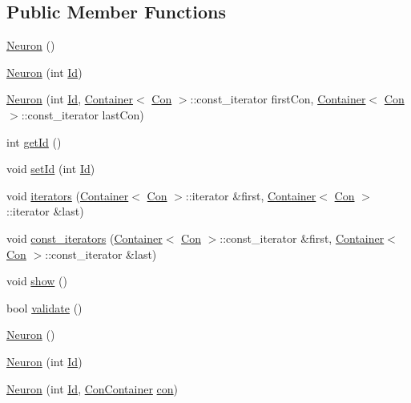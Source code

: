 \subsection*{Public Member Functions}
\begin{DoxyCompactItemize}
\item 
\hyperlink{class_neuron_a823487d01615fadb8ac19a2768dd9d96}{Neuron} ()
\item 
\hyperlink{class_neuron_a05698a11ac18b6cee34d18f63681ddcc}{Neuron} (int \hyperlink{class_neuron_a72bb327a7c5c865e6748a4e074ce0680}{Id})
\item 
\hyperlink{class_neuron_ae611283a65aeb48cc9691211ca8926d7}{Neuron} (int \hyperlink{class_neuron_a72bb327a7c5c865e6748a4e074ce0680}{Id}, \hyperlink{class_container}{Container}$<$ \hyperlink{class_con}{Con} $>$::const\_\-iterator firstCon, \hyperlink{class_container}{Container}$<$ \hyperlink{class_con}{Con} $>$::const\_\-iterator lastCon)
\item 
int \hyperlink{class_neuron_ad9211d55ea50ad6dfbd2676b9e2335e4}{getId} ()
\item 
void \hyperlink{class_neuron_a6eb17a0d297b8c65170911aff37ba968}{setId} (int \hyperlink{class_neuron_a72bb327a7c5c865e6748a4e074ce0680}{Id})
\item 
void \hyperlink{class_neuron_a017ef6451c019cb31e65ace87151184e}{iterators} (\hyperlink{class_container}{Container}$<$ \hyperlink{class_con}{Con} $>$::iterator \&first, \hyperlink{class_container}{Container}$<$ \hyperlink{class_con}{Con} $>$::iterator \&last)
\item 
void \hyperlink{class_neuron_af8810437bb06adacf4c6e4eb15293d36}{const\_\-iterators} (\hyperlink{class_container}{Container}$<$ \hyperlink{class_con}{Con} $>$::const\_\-iterator \&first, \hyperlink{class_container}{Container}$<$ \hyperlink{class_con}{Con} $>$::const\_\-iterator \&last)
\item 
void \hyperlink{class_neuron_a255c3597520c730d798218f7174eff1b}{show} ()
\item 
bool \hyperlink{class_neuron_a95327aa80a9ec949491f214a0c159b5a}{validate} ()
\item 
\hyperlink{class_neuron_a823487d01615fadb8ac19a2768dd9d96}{Neuron} ()
\item 
\hyperlink{class_neuron_a05698a11ac18b6cee34d18f63681ddcc}{Neuron} (int \hyperlink{class_neuron_a72bb327a7c5c865e6748a4e074ce0680}{Id})
\item 
\hyperlink{class_neuron_acc10f105d08a2303a0282bbafa03b032}{Neuron} (int \hyperlink{class_neuron_a72bb327a7c5c865e6748a4e074ce0680}{Id}, \hyperlink{class_con_container}{ConContainer} \hyperlink{class_neuron_a1e92229eb19c3f322e118bdf23b9844e}{con})

\end{DoxyCompactItemize}
